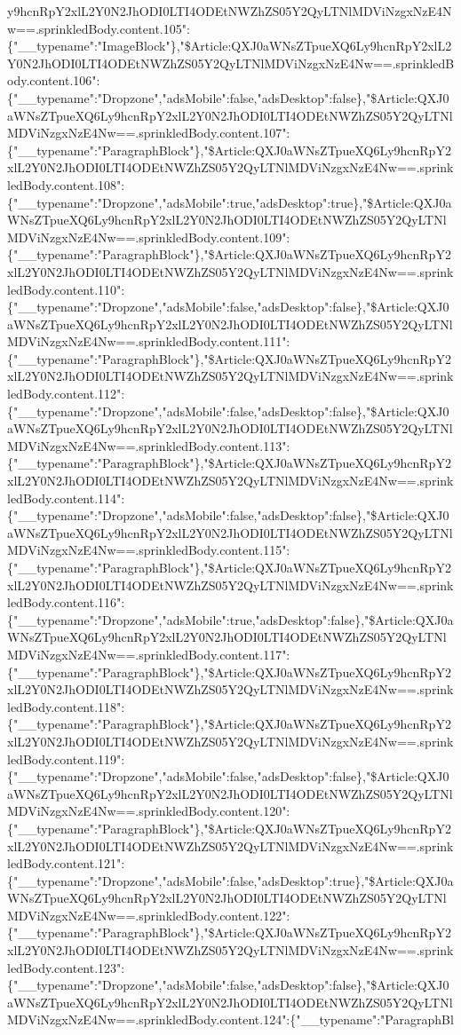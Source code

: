y9hcnRpY2xlL2Y0N2JhODI0LTI4ODEtNWZhZS05Y2QyLTNlMDViNzgxNzE4Nw==.sprinkledBody.content.105":\{"\_\_typename":"ImageBlock"\},"\$Article:QXJ0aWNsZTpueXQ6Ly9hcnRpY2xlL2Y0N2JhODI0LTI4ODEtNWZhZS05Y2QyLTNlMDViNzgxNzE4Nw==.sprinkledBody.content.106":\{"\_\_typename":"Dropzone","adsMobile":false,"adsDesktop":false\},"\$Article:QXJ0aWNsZTpueXQ6Ly9hcnRpY2xlL2Y0N2JhODI0LTI4ODEtNWZhZS05Y2QyLTNlMDViNzgxNzE4Nw==.sprinkledBody.content.107":\{"\_\_typename":"ParagraphBlock"\},"\$Article:QXJ0aWNsZTpueXQ6Ly9hcnRpY2xlL2Y0N2JhODI0LTI4ODEtNWZhZS05Y2QyLTNlMDViNzgxNzE4Nw==.sprinkledBody.content.108":\{"\_\_typename":"Dropzone","adsMobile":true,"adsDesktop":true\},"\$Article:QXJ0aWNsZTpueXQ6Ly9hcnRpY2xlL2Y0N2JhODI0LTI4ODEtNWZhZS05Y2QyLTNlMDViNzgxNzE4Nw==.sprinkledBody.content.109":\{"\_\_typename":"ParagraphBlock"\},"\$Article:QXJ0aWNsZTpueXQ6Ly9hcnRpY2xlL2Y0N2JhODI0LTI4ODEtNWZhZS05Y2QyLTNlMDViNzgxNzE4Nw==.sprinkledBody.content.110":\{"\_\_typename":"Dropzone","adsMobile":false,"adsDesktop":false\},"\$Article:QXJ0aWNsZTpueXQ6Ly9hcnRpY2xlL2Y0N2JhODI0LTI4ODEtNWZhZS05Y2QyLTNlMDViNzgxNzE4Nw==.sprinkledBody.content.111":\{"\_\_typename":"ParagraphBlock"\},"\$Article:QXJ0aWNsZTpueXQ6Ly9hcnRpY2xlL2Y0N2JhODI0LTI4ODEtNWZhZS05Y2QyLTNlMDViNzgxNzE4Nw==.sprinkledBody.content.112":\{"\_\_typename":"Dropzone","adsMobile":false,"adsDesktop":false\},"\$Article:QXJ0aWNsZTpueXQ6Ly9hcnRpY2xlL2Y0N2JhODI0LTI4ODEtNWZhZS05Y2QyLTNlMDViNzgxNzE4Nw==.sprinkledBody.content.113":\{"\_\_typename":"ParagraphBlock"\},"\$Article:QXJ0aWNsZTpueXQ6Ly9hcnRpY2xlL2Y0N2JhODI0LTI4ODEtNWZhZS05Y2QyLTNlMDViNzgxNzE4Nw==.sprinkledBody.content.114":\{"\_\_typename":"Dropzone","adsMobile":false,"adsDesktop":false\},"\$Article:QXJ0aWNsZTpueXQ6Ly9hcnRpY2xlL2Y0N2JhODI0LTI4ODEtNWZhZS05Y2QyLTNlMDViNzgxNzE4Nw==.sprinkledBody.content.115":\{"\_\_typename":"ParagraphBlock"\},"\$Article:QXJ0aWNsZTpueXQ6Ly9hcnRpY2xlL2Y0N2JhODI0LTI4ODEtNWZhZS05Y2QyLTNlMDViNzgxNzE4Nw==.sprinkledBody.content.116":\{"\_\_typename":"Dropzone","adsMobile":true,"adsDesktop":false\},"\$Article:QXJ0aWNsZTpueXQ6Ly9hcnRpY2xlL2Y0N2JhODI0LTI4ODEtNWZhZS05Y2QyLTNlMDViNzgxNzE4Nw==.sprinkledBody.content.117":\{"\_\_typename":"ParagraphBlock"\},"\$Article:QXJ0aWNsZTpueXQ6Ly9hcnRpY2xlL2Y0N2JhODI0LTI4ODEtNWZhZS05Y2QyLTNlMDViNzgxNzE4Nw==.sprinkledBody.content.118":\{"\_\_typename":"ParagraphBlock"\},"\$Article:QXJ0aWNsZTpueXQ6Ly9hcnRpY2xlL2Y0N2JhODI0LTI4ODEtNWZhZS05Y2QyLTNlMDViNzgxNzE4Nw==.sprinkledBody.content.119":\{"\_\_typename":"Dropzone","adsMobile":false,"adsDesktop":false\},"\$Article:QXJ0aWNsZTpueXQ6Ly9hcnRpY2xlL2Y0N2JhODI0LTI4ODEtNWZhZS05Y2QyLTNlMDViNzgxNzE4Nw==.sprinkledBody.content.120":\{"\_\_typename":"ParagraphBlock"\},"\$Article:QXJ0aWNsZTpueXQ6Ly9hcnRpY2xlL2Y0N2JhODI0LTI4ODEtNWZhZS05Y2QyLTNlMDViNzgxNzE4Nw==.sprinkledBody.content.121":\{"\_\_typename":"Dropzone","adsMobile":false,"adsDesktop":true\},"\$Article:QXJ0aWNsZTpueXQ6Ly9hcnRpY2xlL2Y0N2JhODI0LTI4ODEtNWZhZS05Y2QyLTNlMDViNzgxNzE4Nw==.sprinkledBody.content.122":\{"\_\_typename":"ParagraphBlock"\},"\$Article:QXJ0aWNsZTpueXQ6Ly9hcnRpY2xlL2Y0N2JhODI0LTI4ODEtNWZhZS05Y2QyLTNlMDViNzgxNzE4Nw==.sprinkledBody.content.123":\{"\_\_typename":"Dropzone","adsMobile":false,"adsDesktop":false\},"\$Article:QXJ0aWNsZTpueXQ6Ly9hcnRpY2xlL2Y0N2JhODI0LTI4ODEtNWZhZS05Y2QyLTNlMDViNzgxNzE4Nw==.sprinkledBody.content.124":\{"\_\_typename":"ParagraphBl